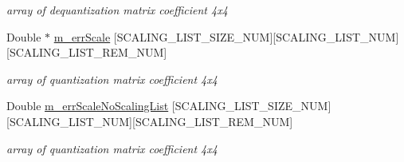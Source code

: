 \begin{DoxyCompactItemize}
\begin{DoxyCompactList}\small\item\em array of dequantization matrix coefficient 4x4 \end{DoxyCompactList}\item 
\mbox{\label{class_t_com_tr_quant_ae164e5a44202250a5d34b94b310e84c9}} 
Double $\ast$ \hyperlink{class_t_com_tr_quant_ae164e5a44202250a5d34b94b310e84c9}{m\+\_\+err\+Scale} \mbox{[}S\+C\+A\+L\+I\+N\+G\+\_\+\+L\+I\+S\+T\+\_\+\+S\+I\+Z\+E\+\_\+\+N\+UM\mbox{]}\mbox{[}S\+C\+A\+L\+I\+N\+G\+\_\+\+L\+I\+S\+T\+\_\+\+N\+UM\mbox{]}\mbox{[}S\+C\+A\+L\+I\+N\+G\+\_\+\+L\+I\+S\+T\+\_\+\+R\+E\+M\+\_\+\+N\+UM\mbox{]}
\begin{DoxyCompactList}\small\item\em array of quantization matrix coefficient 4x4 \end{DoxyCompactList}\item 
\mbox{\label{class_t_com_tr_quant_a4c6bfd49a2d49f8e7fa535b04571ab03}} 
Double \hyperlink{class_t_com_tr_quant_a4c6bfd49a2d49f8e7fa535b04571ab03}{m\+\_\+err\+Scale\+No\+Scaling\+List} \mbox{[}S\+C\+A\+L\+I\+N\+G\+\_\+\+L\+I\+S\+T\+\_\+\+S\+I\+Z\+E\+\_\+\+N\+UM\mbox{]}\mbox{[}S\+C\+A\+L\+I\+N\+G\+\_\+\+L\+I\+S\+T\+\_\+\+N\+UM\mbox{]}\mbox{[}S\+C\+A\+L\+I\+N\+G\+\_\+\+L\+I\+S\+T\+\_\+\+R\+E\+M\+\_\+\+N\+UM\mbox{]}
\begin{DoxyCompactList}\small\item\em array of quantization matrix coefficient 4x4 \end{DoxyCompactList}\end{DoxyCompactItemize}
